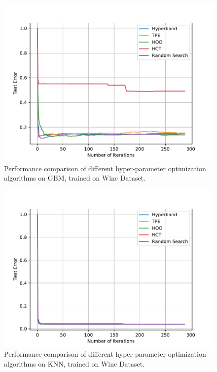 \documentclass[twoside,11pt]{article}
\begin{document}
\begin{figure}[ht]
    \centering
    \includegraphics[scale=0.8]{img/uci/gbm_0.pdf}
    \caption{Performance comparison of different hyper-parameter optimization algorithms on GBM, trained on Wine Dataset.}
    \label{gbm_0}
\end{figure}

\begin{figure}[ht]
    \centering
    \includegraphics[scale=0.8]{img/uci/knn_0.pdf}
    \caption{Performance comparison of different hyper-parameter optimization algorithms on KNN, trained on Wine Dataset.}
    \label{knn_0}
\end{figure}
\end{document}
